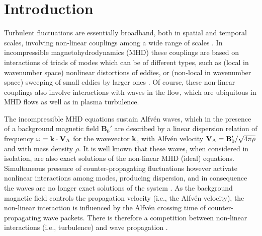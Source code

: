 \documentclass[aip,pop,reprint,amsmath,amssymb,floatfix]{revtex4-1}
\renewcommand{\vec}[1]{\mathbf{#1}}
\begin{document}
\maketitle

\section{Introduction}\label{sec_Intro}

Turbulent fluctuations are essentially broadband, both in spatial and
temporal scales, involving non-linear couplings among a wide range of
scales \cite{frisch_turbulence_1995}. In incompressible
magnetohydrodynamics (MHD) \cite{pouquet_strong_1976,
  zhou_magnetohydrodynamic_2004} these couplings are based on
interactions of triads of modes \cite{zhou_non-gaussian_1993, 
  alexakis_turbulent_2007, teaca_energy_2009, aluie_2010, 
  mininni_scale_2011} which can be of different types, such as (local 
in wavenumber space) nonlinear distortions of eddies, or (non-local 
in wavenumber space) sweeping of small eddies by larger ones
\cite{kraichnan_structure_1959,
  tennekes_eulerian_1975, chen_sweeping_1989, nelkin_time_1990,
  matthaeus_eulerian_2010, servidio_time_2011,
  carbone_anisotropy_2011}. Of course, these non-linear couplings also
involve interactions with waves in the flow, which are ubiquitous in
MHD flows as well as in plasma turbulence.

The incompressible MHD equations sustain Alfv\'en waves, which in the
presence of a background magnetic field $\vec{B}_0'$ are described by
a linear dispersion relation of frequency
$\omega={\bf k} \cdot {\bf V}_\textrm{A}$ for the wavevector
${\bf k}$, with Alfv\'en velocity
${\bf V}_\textrm{A}={\bf B}_0'/\sqrt{4\pi \rho}$ and with mass density
$\rho$. It is well known that these waves, when considered in
isolation, are also exact solutions of the non-linear MHD (ideal)
equations. Simultaneous presence of counter-propagating fluctuations
however activate nonlinear interactions among modes, producing
dispersion, and in consequence the waves are no longer exact solutions
of the system \cite{dobrowolny_1980_HydromagneticTurbulence}. As the
background magnetic field controls the propagation velocity (i.e., the
Alfv\'en velocity), the non-linear interaction is influenced by the
Alfv\'en crossing time of counter-propagating wave packets. There is
therefore a competition between non-linear interactions (i.e.,
turbulence) and wave propagation \cite{dmitruk_waves_2009, rappazzo_coronal_2007}.
\end{document}
